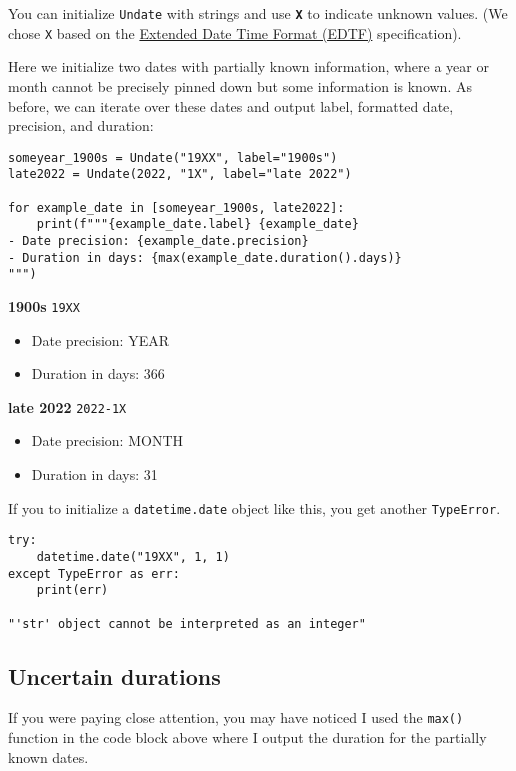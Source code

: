 \documentclass[final]{anthology-ch} %
\begin{document}
You can initialize \texttt{Undate} with strings and use\textbf{ \texttt{X}} to indicate unknown values.  (We chose \texttt{X} based on the \href{https://www.loc.gov/standards/datetime/}{Extended Date Time Format (EDTF)} specification).

Here we initialize two dates with partially known information, where a year or month cannot be precisely pinned down but some information is known. As before, we can iterate over these dates and output label, formatted date, precision, and duration:

\begin{verbatim}
someyear_1900s = Undate("19XX", label="1900s")
late2022 = Undate(2022, "1X", label="late 2022")

for example_date in [someyear_1900s, late2022]:
    print(f"""{example_date.label} {example_date}
- Date precision: {example_date.precision}
- Duration in days: {max(example_date.duration().days)}
""")
\end{verbatim}



\noindent
\textbf{1900s} \texttt{19XX}
\begin{itemize}
    \item Date precision: YEAR
    \item Duration in days: 366
\end{itemize}
    


\noindent
\textbf{late 2022} \texttt{2022-1X}
\begin{itemize}
    \item Date precision: MONTH
    \item Duration in days: 31
\end{itemize}    

If you to initialize a \texttt{datetime.date} object like this, you get another \texttt{TypeError}.    

\begin{verbatim}
try:
    datetime.date("19XX", 1, 1)
except TypeError as err:
    print(err)

"'str' object cannot be interpreted as an integer"
\end{verbatim}

\subsection{Uncertain durations}

If you were paying close attention, you may have noticed I used the \texttt{max()} function in the code block above where I output the duration for the partially known dates.
\end{document}
